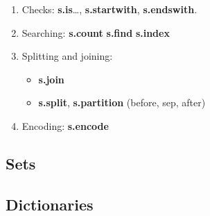 \documentclass[a4paper, twoside, 8pt]{extarticle}
\newenvironment{enumx} {
	\begin{enumerate}[leftmargin=*]
	\setlength{\topsep}{0pt}
	\setlength{\itemsep}{0pt}
	\setlength{\parskip}{0pt}
	\setlength{\parsep}{0pt}
	}
{\end{enumerate}}
\newenvironment{itemx} {
	\begin{itemize}[leftmargin=*,noitemsep,topsep=0pt]
	}
{\end{itemize}}
\newcommand{\python}[1] {\textbf{\color{blue}#1}}
\begin{document}
\begin{multicols*}{3}
\begin{enumx}
\item Checks:
\python{s.is}\ldots,
\python{s.startwith}, 
\python{s.endswith}.

\item Searching:
\python{s.count} 
\python{s.find} 
\python{s.index} 

\item Splitting and joining:
\begin{itemx}
	\item \python{s.join} 
	\item \python{s.split},
	      \python{s.partition} (before, sep, after)
\end{itemx}

\item Encoding: 
\python{s.encode} 
\end{enumx}

\subsection{Sets}

\subsection{Dictionaries}

\end{multicols*}
\end{document}
